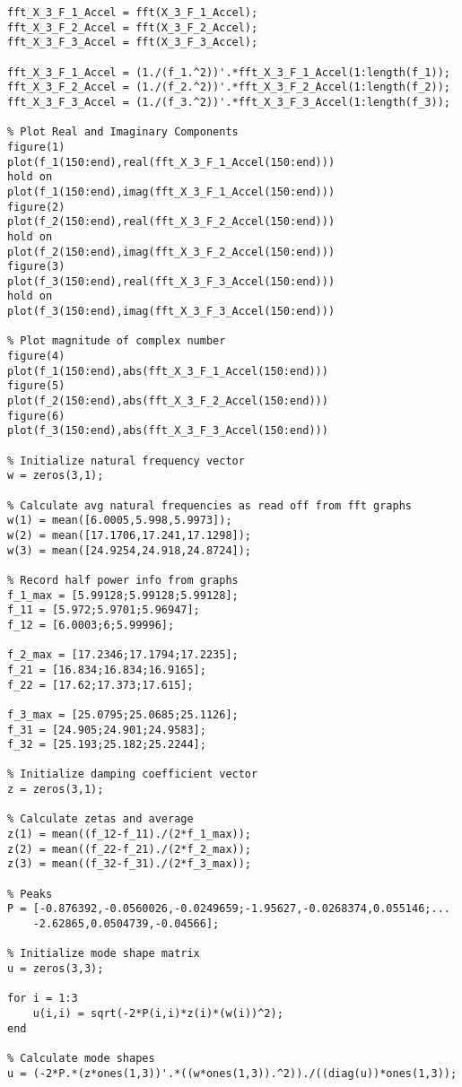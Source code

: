 \documentclass{article}
\begin{document}
\begin{lstlisting}[style=Matlab-editor]
% FFT and convert to displacement
fft_X_3_F_1_Accel = fft(X_3_F_1_Accel);
fft_X_3_F_2_Accel = fft(X_3_F_2_Accel);
fft_X_3_F_3_Accel = fft(X_3_F_3_Accel);

fft_X_3_F_1_Accel = (1./(f_1.^2))'.*fft_X_3_F_1_Accel(1:length(f_1));
fft_X_3_F_2_Accel = (1./(f_2.^2))'.*fft_X_3_F_2_Accel(1:length(f_2));
fft_X_3_F_3_Accel = (1./(f_3.^2))'.*fft_X_3_F_3_Accel(1:length(f_3));

% Plot Real and Imaginary Components
figure(1)
plot(f_1(150:end),real(fft_X_3_F_1_Accel(150:end)))
hold on
plot(f_1(150:end),imag(fft_X_3_F_1_Accel(150:end)))
figure(2)
plot(f_2(150:end),real(fft_X_3_F_2_Accel(150:end)))
hold on
plot(f_2(150:end),imag(fft_X_3_F_2_Accel(150:end)))
figure(3)
plot(f_3(150:end),real(fft_X_3_F_3_Accel(150:end)))
hold on
plot(f_3(150:end),imag(fft_X_3_F_3_Accel(150:end)))

% Plot magnitude of complex number
figure(4)
plot(f_1(150:end),abs(fft_X_3_F_1_Accel(150:end)))
figure(5)
plot(f_2(150:end),abs(fft_X_3_F_2_Accel(150:end)))
figure(6)
plot(f_3(150:end),abs(fft_X_3_F_3_Accel(150:end)))

% Initialize natural frequency vector
w = zeros(3,1);

% Calculate avg natural frequencies as read off from fft graphs
w(1) = mean([6.0005,5.998,5.9973]);
w(2) = mean([17.1706,17.241,17.1298]);
w(3) = mean([24.9254,24.918,24.8724]);

% Record half power info from graphs
f_1_max = [5.99128;5.99128;5.99128];
f_11 = [5.972;5.9701;5.96947];
f_12 = [6.0003;6;5.99996];

f_2_max = [17.2346;17.1794;17.2235];
f_21 = [16.834;16.834;16.9165];
f_22 = [17.62;17.373;17.615];

f_3_max = [25.0795;25.0685;25.1126];
f_31 = [24.905;24.901;24.9583];
f_32 = [25.193;25.182;25.2244];

% Initialize damping coefficient vector
z = zeros(3,1);

% Calculate zetas and average
z(1) = mean((f_12-f_11)./(2*f_1_max));
z(2) = mean((f_22-f_21)./(2*f_2_max));
z(3) = mean((f_32-f_31)./(2*f_3_max));

% Peaks
P = [-0.876392,-0.0560026,-0.0249659;-1.95627,-0.0268374,0.055146;...
    -2.62865,0.0504739,-0.04566];

% Initialize mode shape matrix
u = zeros(3,3);

for i = 1:3
    u(i,i) = sqrt(-2*P(i,i)*z(i)*(w(i))^2);
end

% Calculate mode shapes
u = (-2*P.*(z*ones(1,3))'.*((w*ones(1,3)).^2))./((diag(u))*ones(1,3));


\end{lstlisting}
\end{document}
